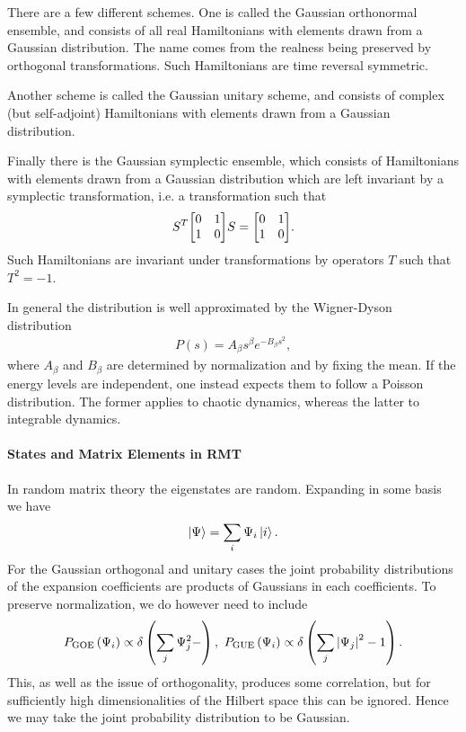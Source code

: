 There are a few different schemes. One is called the Gaussian orthonormal ensemble, and consists of all real Hamiltonians with elements drawn from a Gaussian distribution. The name comes from the realness being preserved by orthogonal transformations. Such Hamiltonians are time reversal symmetric.

Another scheme is called the Gaussian unitary scheme, and consists of complex (but self-adjoint) Hamiltonians with elements drawn from a Gaussian distribution.

Finally there is the Gaussian symplectic ensemble, which consists of Hamiltonians with elements drawn from a Gaussian distribution which are left invariant by a symplectic transformation, i.e. a transformation such that
\begin{align*}
	S^{T}\mqty[
		0 & 1 \\
		1 & 0
	]S = \mqty[
		0 & 1 \\
		1 & 0
	].
\end{align*}
Such Hamiltonians are invariant under transformations by operators $T$ such that $T^{2} = -1$.

In general the distribution is well approximated by the Wigner-Dyson distribution
\begin{align*}
	P(s) = A_{\beta}s^{\beta}e^{-B_{\beta}s^{2}},
\end{align*}
where $A_{\beta}$ and $B_{\beta}$ are determined by normalization and by fixing the mean. If the energy levels are independent, one instead expects them to follow a Poisson distribution. The former applies to chaotic dynamics, whereas the latter to integrable dynamics.

\paragraph{States and Matrix Elements in RMT}
In random matrix theory the eigenstates are random. Expanding in some basis we have
\begin{align*}
	\ket{\Psi} = \sum\limits_{i}\Psi_{i}\ket{i}.
\end{align*}
For the Gaussian orthogonal and unitary cases the joint probability distributions of the expansion coefficients are products of Gaussians in each coefficients. To preserve normalization, we do however need to include
\begin{align*}
	P_{\text{GOE}}\left(\Psi_{i}\right) \propto \delta\left(\sum\limits_{j}\Psi_{j}^{2} - \right),\ P_{\text{GUE}}\left(\Psi_{i}\right) \propto \delta\left(\sum\limits_{j}\abs{\Psi_{j}}^{2} - 1\right).
\end{align*}
This, as well as the issue of orthogonality, produces some correlation, but for sufficiently high dimensionalities of the Hilbert space this can be ignored. Hence we may take the joint probability distribution to be Gaussian.

